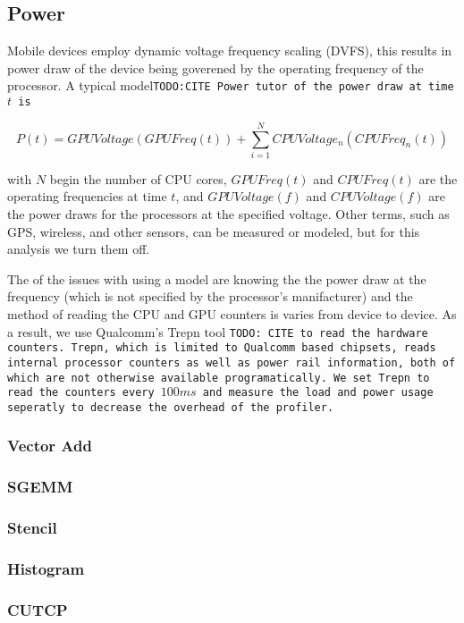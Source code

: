 \subsection{Power}

Mobile devices employ dynamic voltage frequency scaling (DVFS),
  this results in power draw of the device being goverened by
  the operating frequency of the processor.
A typical model\tt{TODO:CITE Power tutor} of the power draw at time $t$ is

\[
P(t) = GPUVoltage(GPUFreq(t)) + \sum_{i=1}^{N} CPUVoltage_n(CPUFreq_n(t))
\]

with $N$ begin the number of CPU cores, $GPUFreq(t)$ and $CPUFreq(t)$ are the operating frequencies at time $t$, and $GPUVoltage(f)$ and $CPUVoltage(f)$ are the power draws for the processors at the specified voltage.
Other terms, such as GPS, wireless, and other sensors, can be measured or modeled, but for this analysis we turn them off.

The of the issues with using a model are knowing the the power draw at the 
  frequency (which is not specified by the processor's manifacturer) and the method of reading
  the CPU and GPU counters is varies from device to device.
As a result, we use Qualcomm's Trepn tool \tt{TODO: CITE} to read the hardware
  counters.
Trepn, which is limited to Qualcomm based chipsets, reads internal processor
  counters as well as power rail information, both of which are not otherwise
  available programatically.
We set Trepn to read the counters every $100ms$ and measure the load and power
  usage seperatly to decrease the overhead of the profiler.

\subsubsection{Vector Add}

\subsubsection{SGEMM}

\subsubsection{Stencil}

\subsubsection{Histogram}

\subsubsection{CUTCP}


